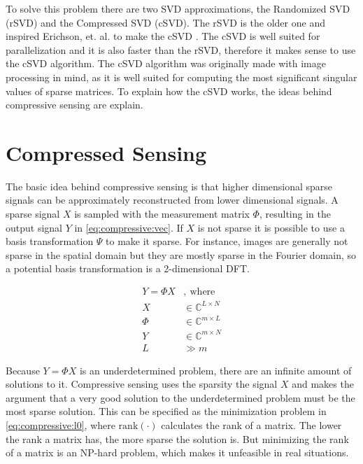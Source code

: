 To solve this problem there are two SVD approximations, the Randomized SVD (rSVD) and the Compressed SVD (cSVD). The rSVD is the older one and inspired Erichson, et. al. to make the cSVD \cite{erichson:csvd}. The cSVD is well suited for parallelization and it is also faster than the rSVD, therefore it makes sense to use the cSVD algorithm. The cSVD algorithm was originally made with image processing in mind, as it is well suited for computing the most significant singular values of sparse matrices. To explain how the cSVD works, the ideas behind compressive sensing are explain.

\section{Compressed Sensing}

The basic idea behind compressive sensing is that higher dimensional sparse signals can be approximately reconstructed from lower dimensional signals. A sparse signal $X$ is sampled with the measurement matrix $\Phi$, resulting in the output signal $Y$ in \eqref{eq:compressive:vec}. If $X$ is not sparse it is possible to use a basis transformation $\Psi$ to make it sparse. For instance, images are generally not sparse in the spatial domain but they are mostly sparse in the Fourier domain, so a potential basis transformation is a 2-dimensional DFT.

\begin{equation} \label{eq:compressive:vec}
\begin{split}
    Y = \Phi X &, \ \mathrm{where}      \\
    X &\in \mathbb{C}^{L \times N}      \\
    \Phi &\in \mathbb{C}^{m \times L}   \\
    Y &\in \mathbb{C}^{m \times N}      \\
    L &\gg m
\end{split}
\end{equation}

Because $Y = \Phi X$ is an underdetermined problem, there are an infinite amount of solutions to it. Compressive sensing uses the sparsity the signal $X$ and makes the argument that a very good solution to the underdetermined problem must be the most sparse solution. This can be specified as the minimization problem in \eqref{eq:compressive:l0}, where $\mathrm{rank}(\cdot)$ calculates the rank of a matrix. The lower the rank a matrix has, the more sparse the solution is. But minimizing the rank of a matrix is an NP-hard problem, which makes it unfeasible in real situations.


